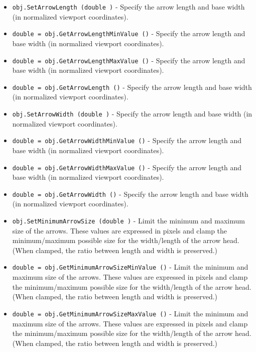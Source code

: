 \begin{itemize}
\item  \verb|obj.SetArrowLength (double )| -  Specify the arrow length and base width (in normalized viewport
 coordinates).

\item  \verb|double = obj.GetArrowLengthMinValue ()| -  Specify the arrow length and base width (in normalized viewport
 coordinates).

\item  \verb|double = obj.GetArrowLengthMaxValue ()| -  Specify the arrow length and base width (in normalized viewport
 coordinates).

\item  \verb|double = obj.GetArrowLength ()| -  Specify the arrow length and base width (in normalized viewport
 coordinates).

\item  \verb|obj.SetArrowWidth (double )| -  Specify the arrow length and base width (in normalized viewport
 coordinates).

\item  \verb|double = obj.GetArrowWidthMinValue ()| -  Specify the arrow length and base width (in normalized viewport
 coordinates).

\item  \verb|double = obj.GetArrowWidthMaxValue ()| -  Specify the arrow length and base width (in normalized viewport
 coordinates).

\item  \verb|double = obj.GetArrowWidth ()| -  Specify the arrow length and base width (in normalized viewport
 coordinates).

\item  \verb|obj.SetMinimumArrowSize (double )| -  Limit the minimum and maximum size of the arrows. These values are
 expressed in pixels and clamp the minimum/maximum possible size for the
 width/length of the arrow head. (When clamped, the ratio between length
 and width is preserved.)

\item  \verb|double = obj.GetMinimumArrowSizeMinValue ()| -  Limit the minimum and maximum size of the arrows. These values are
 expressed in pixels and clamp the minimum/maximum possible size for the
 width/length of the arrow head. (When clamped, the ratio between length
 and width is preserved.)

\item  \verb|double = obj.GetMinimumArrowSizeMaxValue ()| -  Limit the minimum and maximum size of the arrows. These values are
 expressed in pixels and clamp the minimum/maximum possible size for the
 width/length of the arrow head. (When clamped, the ratio between length
 and width is preserved.)


\end{itemize}
